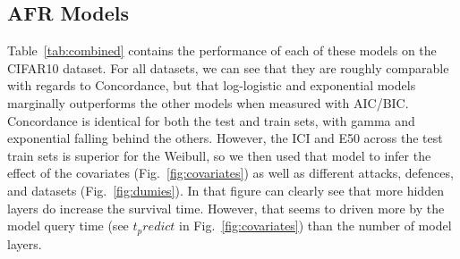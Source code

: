 \subsection{AFR Models}

Table~\ref{tab:combined} contains the performance of each of these models on the CIFAR10 dataset. For all datasets, we can see that they are roughly comparable with regards to Concordance, but that log-logistic and exponential models marginally outperforms the other models when measured with AIC/BIC. Concordance is identical for both the test and train sets, with gamma and exponential falling behind the others. However, the ICI and E50 across the test train sets is superior for the Weibull, so we then used that model to infer the effect of the covariates (Fig.~\ref{fig:covariates}) as well as different attacks, defences, and datasets (Fig.~\ref{fig:dumies}). In that figure can clearly see that more hidden layers do increase the survival time. However, that seems to driven more by the model query time (see $t_predict$ in Fig.~\ref{fig:covariates}) than the number of model layers.

